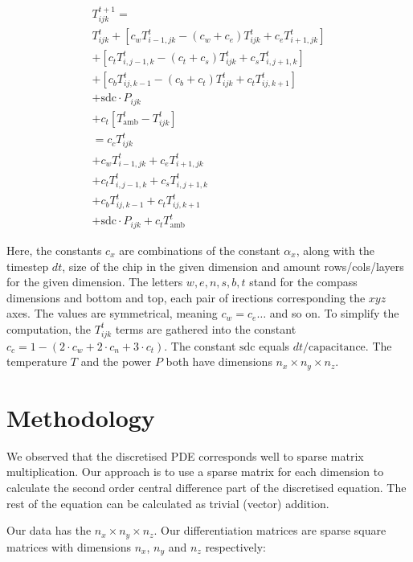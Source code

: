 \begin{align}
    T^{t+1}_{ijk} =\\
    T^t_{ijk}
    + \left[ c_w T^t_{i-1,jk} - (c_w + c_e) T^t_{ijk} + c_e T^t_{i+1,jk} \right]\\
    + \left[ c_t T^t_{i,j-1,k} - (c_t + c_s) T^t_{ijk} + c_s T^t_{i,j+1,k} \right]\\
    + \left[ c_b T^t_{ij,k-1} - (c_b + c_t) T^t_{ijk} + c_t T^t_{ij,k+1} \right]\\
    + \text{sdc} \cdot P_{ijk} \\
    + c_t [T^t_{\text{amb}} - T^t_{ijk}] \\
    = c_c T^t_{ijk} \\
    + c_w T^t_{i-1,jk} + c_e T^t_{i+1,jk} \\
    + c_t T^t_{i,j-1,k} + c_s T^t_{i,j+1,k} \\
    + c_b T^t_{ij,k-1} + c_t T^t_{ij,k+1} \\
    + \text{sdc} \cdot P_{ijk} + c_t T^t_{\text{amb}}
\end{align}

Here, the constants \(c_x\) are combinations of the constant
\(\alpha_x\), along with the timestep \(dt\), size of the chip in the
given dimension and amount rows/cols/layers for the given dimension. The
letters \(w,e,n,s,b,t\) stand for the compass dimensions and bottom and
top, each pair of irections corresponding the \(xyz\) axes. The values
are symmetrical, meaning \(c_w = c_e \ldots\) and so on. To simplify the
computation, the \(T^t_{ijk}\) terms are gathered into the constant
\(c_c = 1 - (2 \cdot c_w + 2 \cdot c_n + 3 \cdot c_t)\). The constant
\(\text{sdc}\) equals \(dt / \text{capacitance}\). The temperature \(T\)
and the power \(P\) both have dimensions \(n_x \times n_y \times n_z\).

\hypertarget{methodology}{%
\section{Methodology}\label{methodology}}

We observed that the discretised PDE corresponds well to sparse matrix
multiplication. Our approach is to use a sparse matrix for each
dimension to calculate the second order central difference part of the
discretised equation. The rest of the equation can be calculated as
trivial (vector) addition.

Our data has the \(n_x \times n_y \times n_z\). Our differentiation
matrices are sparse square matrices with dimensions \(n_x\), \(n_y\) and
\(n_z\) respectively:

